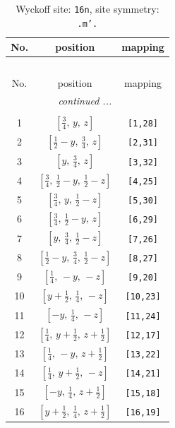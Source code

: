 \documentclass[fleqn,8pt]{jsarticle}
\begin{document}
\renewcommand{\arraystretch}{1.2}
\begin{longtable}{ccc}
\caption{Wyckoff site: {\tt 16n}, site symmetry: {\tt .m'.}}
 \\
 \hline \hline
No. & position & mapping \\ \hline \endfirsthead

\multicolumn{2}{l}{\tablename\ \thetable{}} \\
 \hline \hline
No. & position & mapping \\ \hline \endhead

 \hline \hline
\multicolumn{2}{r}{\footnotesize\it continued ...} \\ \endfoot

 \hline \hline
\multicolumn{2}{r}{} \\ \endlastfoot

1 & $\left[ \frac{3}{4},\, y,\, z \right]$ & {\tt [1,28]} \\ \hline
2 & $\left[ \frac{1}{2} - y,\, \frac{3}{4},\, z \right]$ & {\tt [2,31]} \\ \hline
3 & $\left[ y,\, \frac{3}{4},\, z \right]$ & {\tt [3,32]} \\ \hline
4 & $\left[ \frac{3}{4},\, \frac{1}{2} - y,\, \frac{1}{2} - z \right]$ & {\tt [4,25]} \\ \hline
5 & $\left[ \frac{3}{4},\, y,\, \frac{1}{2} - z \right]$ & {\tt [5,30]} \\ \hline
6 & $\left[ \frac{3}{4},\, \frac{1}{2} - y,\, z \right]$ & {\tt [6,29]} \\ \hline
7 & $\left[ y,\, \frac{3}{4},\, \frac{1}{2} - z \right]$ & {\tt [7,26]} \\ \hline
8 & $\left[ \frac{1}{2} - y,\, \frac{3}{4},\, \frac{1}{2} - z \right]$ & {\tt [8,27]} \\ \hline
9 & $\left[ \frac{1}{4},\, - y,\, - z \right]$ & {\tt [9,20]} \\ \hline
10 & $\left[ y + \frac{1}{2},\, \frac{1}{4},\, - z \right]$ & {\tt [10,23]} \\ \hline
11 & $\left[ - y,\, \frac{1}{4},\, - z \right]$ & {\tt [11,24]} \\ \hline
12 & $\left[ \frac{1}{4},\, y + \frac{1}{2},\, z + \frac{1}{2} \right]$ & {\tt [12,17]} \\ \hline
13 & $\left[ \frac{1}{4},\, - y,\, z + \frac{1}{2} \right]$ & {\tt [13,22]} \\ \hline
14 & $\left[ \frac{1}{4},\, y + \frac{1}{2},\, - z \right]$ & {\tt [14,21]} \\ \hline
15 & $\left[ - y,\, \frac{1}{4},\, z + \frac{1}{2} \right]$ & {\tt [15,18]} \\ \hline
16 & $\left[ y + \frac{1}{2},\, \frac{1}{4},\, z + \frac{1}{2} \right]$ & {\tt [16,19]} \\
\end{longtable}
\end{document}
